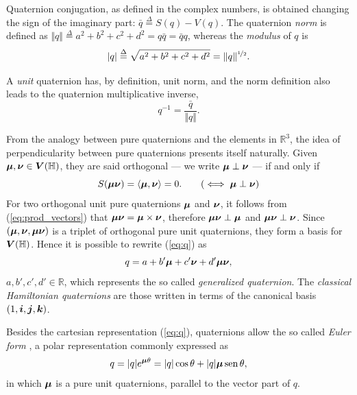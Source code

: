 Quaternion conjugation, as defined in the complex numbers, is obtained changing the sign of the imaginary part: $ \bar{q} \overset{\Delta}{=} S(q) - V(q) $. The quaternion \textit{norm} is defined as $\Vert q \Vert \overset{\Delta}{=} a^2 + b^2 + c^2 + d^2 = q \bar{q} = \bar{q} q$, whereas the \textit{modulus} of $q$ \cite{ell2014quaternion} is
\begin{equation}
\label{eq:modulusq}
|q| \overset{\Delta}{=} \sqrt{a^2 + b^2 + c^2 + d^2} = \Vert q \Vert^{\nicefrac{1}{2}}.
\end{equation}

A \textit{unit} quaternion has, by definition, unit norm, and the norm definition also leads to the quaternion multiplicative inverse,
\begin{equation}
q^{-1} = \frac{\bar{q}}{\Vert q \Vert}.
\end{equation}

From the analogy between pure quaternions and the elements in $ \mathbb{R}^3 $, the idea of perpendicularity between pure quaternions presents itself naturally. Given $ \boldsymbol{\mu},  \boldsymbol{\nu} \in \boldsymbol{V}(\mathbb{H})$, they are said orthogonal --- we write $ \boldsymbol{\mu} \perp \boldsymbol{\nu} $ --- if and only if
\begin{equation}
S(\qmu \qnu) = \langle \qmu, \qnu \rangle = 0.
\tag{$ \iff \qmu \perp \qnu $}
\end{equation}
For two orthogonal unit pure quaternions $ \boldsymbol{\mu} $ and $ \boldsymbol{\nu} $, it follows from (\ref{eq:prod_vectors}) that $ \boldsymbol{\mu} \boldsymbol{\nu}  = \boldsymbol{\mu} \times \boldsymbol{\nu}$, therefore $ \boldsymbol{\mu} \boldsymbol{\nu} \perp \boldsymbol{\mu} $ and $ \boldsymbol{\mu} \boldsymbol{\nu} \perp \boldsymbol{\nu} $. Since $ (\boldsymbol{\mu}, \boldsymbol{\nu}, \boldsymbol{\mu} \boldsymbol{\nu}) $ is a triplet of orthogonal pure unit quaternions, they form a basis for $ \boldsymbol{V} (\mathbb{H}) $. Hence it is possible to rewrite (\ref{eq:q}) as
\begin{equation}
\label{eq:quat_generalizado}
q = a + b'\boldsymbol{\mu} + c'\boldsymbol{\nu} + d'\boldsymbol{\mu} \boldsymbol{\nu},
\end{equation}
$a, b', c', d' \in \mathbb{R}$,
which represents the so called \emph{generalized quaternion}. The \emph{classical Hamiltonian quaternions} are those written in terms of the canonical basis $ (1, \boldsymbol{i}, \boldsymbol{j}, \boldsymbol{k}) $.


Besides the cartesian representation (\ref{eq:q}), quaternions allow the so called \emph{Euler form} \cite{ell2014quaternion}, a polar representation commonly expressed as
\begin{equation}
\label{eq:euler}
q = |q| e^{\boldsymbol{\mu} \theta} = |q|\cos \theta + |q|\boldsymbol{\mu} \mathrm{\, sen \,} \theta,
\end{equation}
in which $ \boldsymbol{\mu} $ is a pure unit quaternions, parallel to the vector part of $ q $.

